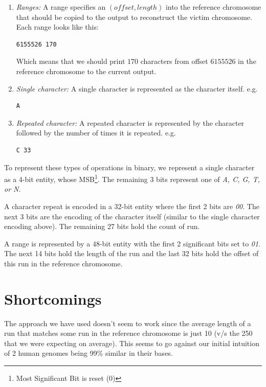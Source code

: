 \documentclass[11pt,twocolumn]{article}
\begin{document}
\begin{enumerate}

\item \textit{Ranges:} A range specifies an $(offset, length)$ into
  the reference chromosome that should be copied to the output to
  reconstruct the victim chromosome. Each range looks like this:
\begin{verbatim}
6155526 170
\end{verbatim}
Which means that we should print $170$ characters from offset
$6155526$ in the reference chromosome to the current output.

\item \textit{Single character:} A single character is represented as
  the character itself. e.g.
\begin{verbatim}
A
\end{verbatim}

\item \textit{Repeated character:} A repeated character is represented
  by the character followed by the number of times it is
  repeated. e.g.
\begin{verbatim}
C 33
\end{verbatim}

\end{enumerate}

To represent these types of operations in binary, we represent a
single character as a 4-bit entity, whose MSB\footnote{Most
  Significant Bit is reset (0)}. The remaining 3 bits represent one of
\textit{A, C, G, T, or N}.

A character repeat is encoded in a 32-bit entity where the first 2
bits are \textit{00}. The next 3 bits are the encoding of the
character itself (similar to the single character encoding above). The
remaining 27 bits hold the count of run.

A range is represented by a 48-bit entity with the first 2 significant
bits set to \textit{01}. The next 14 bits hold the length of the run
and the last 32 bits hold the offset of this run in the reference
chromosome.

\section*{Shortcomings}

The approach we have used doesn't seem to work since the average
length of a run that matches some run in the reference chromosome is
just 10 (v/s the 250 that we were expecting on average). This seems to
go against our initial intuition of 2 human genomes being 99\% similar
in their bases.
\end{document}
